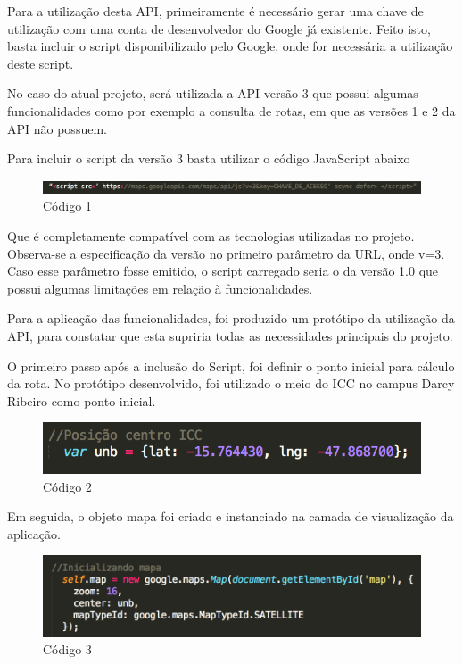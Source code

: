 Para a utilização desta API, primeiramente é necessário gerar uma chave de utilização com uma conta de desenvolvedor do Google já existente. Feito isto, basta incluir o script disponibilizado pelo Google, onde for necessária a utilização deste script. 

No caso do atual projeto, será utilizada a API versão 3 que possui algumas funcionalidades como por exemplo a consulta de rotas, em que as versões 1 e 2 da API não possuem.

Para incluir o script da versão 3 basta utilizar o código JavaScript abaixo

\graphicspath{{figuras/}}
\begin{figure}[!htb]
\centering
\includegraphics[width=\textwidth]{codigo1}
\caption{Código 1}
\label{img:codigo1}
\end{figure}

Que é completamente compatível com as tecnologias utilizadas no projeto. Observa-se a especificação da versão no primeiro parâmetro da URL, onde v=3. Caso esse parâmetro fosse emitido, o script carregado seria o da versão 1.0 que possui algumas limitações em relação à funcionalidades.

Para a aplicação das funcionalidades, foi produzido um protótipo da utilização da API, para constatar que esta supriria todas as necessidades principais do projeto.

O primeiro passo após a inclusão do Script, foi definir o ponto inicial para cálculo da rota. No protótipo desenvolvido, foi utilizado o meio do ICC no campus Darcy Ribeiro como ponto inicial.

\graphicspath{{figuras/}}
\begin{figure}[!htb]
\centering
\includegraphics[scale=0.80]{codigo2}
\caption{Código 2}
\label{img:codigo2}
\end{figure}

Em seguida, o objeto mapa foi criado e instanciado na camada de visualização da aplicação.	
	
\graphicspath{{figuras/}}
\begin{figure}[!htb]
\centering
\includegraphics[scale=0.80]{codigo3}
\caption{Código 3}
\label{img:codigo3}
\end{figure}

